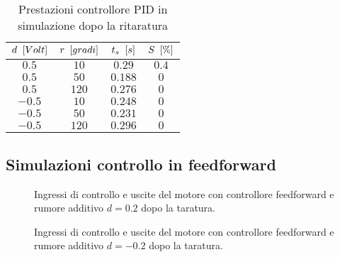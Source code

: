 			\begin{center}
				 
			\end{center}	
			
			\begin{center}
				 
			\end{center}		
		
			\begin{table}[H]
				\centering
				\begin{tabular}{cccc}
					\toprule
					\textbf{$d \singleSpacing [Volt]$} & \textbf{$r \singleSpacing [gradi]$} & \textbf{$t_s \singleSpacing [s]$} & \textbf{$S \singleSpacing [\%]$}\\
					\midrule
					$0.5$   & $10$  & $0.29$  & $0.4$  \\
					$0.5$   & $50$  & $0.188$ & $0$    \\
					$0.5$   & $120$ & $0.276$ & $0$    \\
					$-0.5$  & $10$  & $0.248$ & $0$    \\
					$-0.5$  & $50$  & $0.231$ & $0$    \\ 	
					$-0.5$  & $120$ & $0.296$ & $0$    \\ 
					\bottomrule
				\end{tabular}
				\caption{Prestazioni controllore PID in simulazione dopo la ritaratura}
				\label{tab:PIDsimRit}
			\end{table}			
			
			
	\subsection{Simulazioni controllo in feedforward}
	\label{subapp:FFsimulazione}	

		\begin{figure}[H]
			\centering
			 
			\caption{Ingressi di controllo e uscite del motore con controllore feedforward e rumore additivo $d=0.2$ dopo la taratura.}		
		\end{figure}		
		
		\begin{figure}[H]
			\centering
			 
			\caption{Ingressi di controllo e uscite del motore con controllore feedforward e rumore additivo $d=-0.2$ dopo la taratura.}		
		\end{figure}	
		
